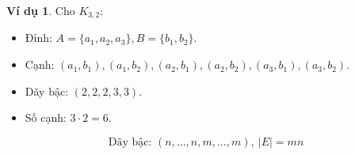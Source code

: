 \documentclass[a4paper,12pt]{article}
\theoremstyle{plain}
\theoremstyle{definition}
\newtheorem{example}{Ví dụ}
\begin{document}
\begin{example}
Cho \( K_{3,2} \):
\begin{itemize}
    \item Đỉnh: \( A = \{a_1, a_2, a_3\}, B = \{b_1, b_2\} \).
    \item Cạnh: \( (a_1, b_1), (a_1, b_2), (a_2, b_1), (a_2, b_2), (a_3, b_1), (a_3, b_2) \).
    \item Dãy bậc: \( (2, 2, 2, 3, 3) \).
    \item Số cạnh: \( 3 \cdot 2 = 6 \).
\end{itemize}
\end{example}

\[
\boxed{\text{Dãy bậc: } (n, \ldots, n, m, \ldots, m), \ |E| = mn}
\]
\end{document}
